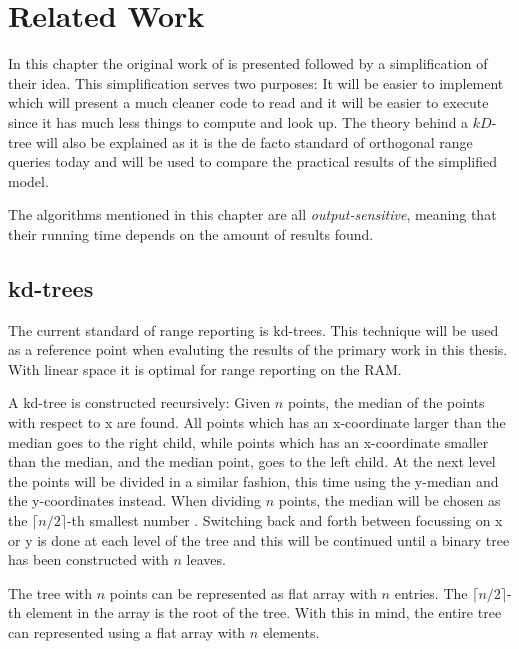 \chapter{Related Work}
\label{ch:relatedwork}

In this chapter the original work of \citet{chanetal} is presented followed by a simplification of their idea. This simplification serves two purposes: It will be easier to implement which will present a much cleaner code to read and it will be easier to execute since it has much less things to compute and look up. The theory behind a $kD$-tree will also be explained as it is the de facto standard of orthogonal range queries today and will be used to compare the practical results of the simplified model.

The algorithms mentioned in this chapter are all \emph{output-sensitive}, meaning that their running time depends on the amount of results found.

\section{kd-trees}

The current standard of range reporting is kd-trees. This technique will be used as a reference point when evaluting the results of the primary work in this thesis. With linear space it is optimal for range reporting on the RAM.

A kd-tree is constructed recursively: Given $n$ points, the median of the points with respect to x are found. All points which has an x-coordinate larger than the median goes to the right child, while points which has an x-coordinate smaller than the median, and the median point, goes to the left child. At the next level the points will be divided in a similar fashion, this time using the y-median and the y-coordinates instead. When dividing $n$ points, the median will be chosen as the $\lceil n/2 \rceil$-th smallest number \cite{compgeo}.
Switching back and forth between focussing on x or y is done at each level of the tree and this will be continued until a binary tree has been constructed with $n$ leaves.

The tree with $n$ points can be represented as flat array with $n$ entries. The $\lceil n/2 \rceil$-th element in the array is the root of the tree.
 With this in mind, the entire tree can represented using a flat array with $n$ elements. 





